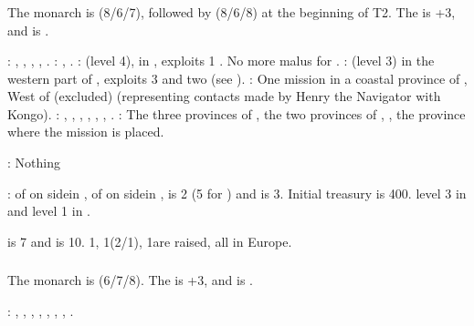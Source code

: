 \subsubsection{\paysmajeurPortugal}
\aparag The monarch is  (8/6/7), followed by
 (8/6/8) at the beginning of T2. The \STAB is +3, and \POR
is .

: , \provinceBeira,
\provinceTejo, \provinceAlentejo, \provinceAlgarve.
: \provinceTanger, \provinceAcores.
:  (level 4), in
, exploits 1 . No more malus for
\COLaction.
: \constructionElmina (level 3) in the western part
of \granderegionCotedor, exploits 3  and two  (see
).
: One mission in a coastal province of
\continentAfrica, West of \granderegionCap (excluded) (representing contacts
made by Henry the Navigator with Kongo).
: \seazoneAcores, \seazoneCanarias, \seazoneArguin,
\seazoneGambie, \seazoneGuinee, \seazoneAngola, .
: The three provinces of \granderegionCameroun, the
two provinces of \granderegionCotedor, , the province
where the mission is placed.

: Nothing

:
\bparag \MNU of  on side\facemoins in \provinceTejo, \MNU of
 on side\facemoins in , \FTI is 2 (5 for
\ROTW) and \DTI is 3.
\bparag Initial treasury is 400\ducats.
\bparag \TradeFLEET level 3 in  and level 1 in .

\aparag {} is 7 and  is
10. 1\ARMY\facemoins, 1\FLEET\facemoins (2\NWD/1\NTD), 1\LD are raised, all in
Europe.


\subsubsection{\paysmajeurRussie}
\aparag The monarch is  (6/7/8). The \STAB is +3, and \RUS
is .

: \provinceMoskva, \provinceKaluga,
\provinceNovgorod, \provinceNeva, \provinceOnega, \provinceLadoga,
\provinceYaroslavl, \provinceVyatka.


